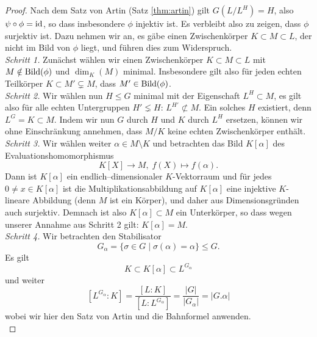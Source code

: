 \documentclass{book}
\begin{document}
\begin{proof}
    Nach dem Satz von Artin (Satz \ref{thm:artin}) gilt $G(L/L^H) = H$, also
    $\psi \circ \phi = \id$, so dass insbesondere $\phi$ injektiv ist. Es
    verbleibt also zu zeigen, dass $\phi$ surjektiv ist. Dazu nehmen wir an, es
    gäbe einen Zwischenkörper $K \subset M \subset L$, der nicht im Bild von
    $\phi$ liegt, und führen dies zum Widerspruch.\\

    \noindent
    \emph{Schritt 1.} Zunächst wählen wir einen Zwischenkörper $K \subset M
    \subset L$ mit $M \notin \Bild(\phi)$ und $\dim_K(M)$ minimal. Insbesondere
    gilt also für jeden echten Teilkörper $K \subset M' \subsetneq M$, dass $M'
    \in \Bild(\phi)$.\\

    \noindent
    \emph{Schritt 2.} Wir wählen nun $H \le G$ minimal mit der Eigenschaft $L^H
    \subset M$, es gilt also für alle echten Untergruppen $H' \lneq H$: $L^{H'}
    \not \subset M$. Ein solches $H$ existiert, denn $L^G = K \subset M$. Indem
    wir nun $G$ durch $H$ und $K$ durch $L^H$ ersetzen, können wir ohne
    Einschränkung annehmen, dass $M/K$ keine echten Zwischenkörper enthält.\\

    \noindent
    \emph{Schritt 3.} Wir wählen weiter $\alpha \in M \setminus K$ und 
    betrachten das Bild $K[\alpha]$ des Evaluationshomomorphismus
    \[
        K[X] \to M,\; f(X) \mapsto f(\alpha).
    \]
    Dann ist $K[\alpha]$ ein endlich--dimensionaler $K$-Vektorraum und für
    jedes $0 \neq x \in K[\alpha]$ ist die Multiplikationsabbildung auf
    $K[\alpha]$ eine injektive $K$-lineare Abbildung (denn $M$ ist ein Körper),
    und daher aus Dimensionsgründen auch surjektiv. Demnach ist also $K[\alpha]
    \subset M$ ein Unterkörper, so dass wegen unserer Annahme aus Schritt 2
    gilt: $K[\alpha] = M$.\\ 

    \noindent
    \emph{Schritt 4.} Wir betrachten den Stabilisator
    \[
        G_{\alpha} = \{ \sigma \in G \; | \; \sigma(\alpha) = \alpha \} \le G.
    \]
    Es gilt 
    \[
        K \subset K[\alpha] \subset L^{G_{\alpha}}
    \]
    und weiter
    \begin{equation}
        \label{eq:bahnartin}
        [L^{G_{\alpha}}:K] = \frac{[L:K]}{[L:L^{G_{\alpha}}]} = \frac{|G|}{|G_{\alpha}|} = |G.\alpha|
    \end{equation}
    wobei wir hier den Satz von Artin und die Bahnformel anwenden.\\


\end{proof}
\end{document}
